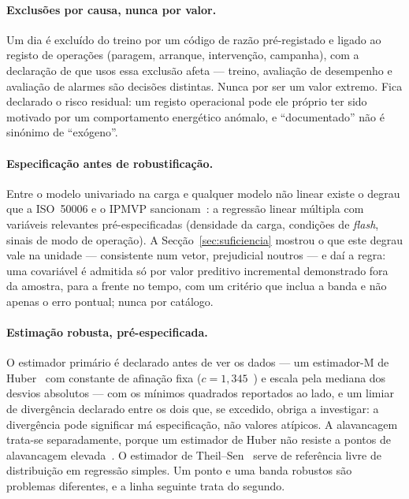 \paragraph{Exclusões por causa, nunca por valor.} Um dia é excluído do treino
por um código de razão pré-registado e ligado ao registo de operações
(paragem, arranque, intervenção, campanha), com a declaração de que usos
essa exclusão afeta --- treino, avaliação de desempenho e avaliação de
alarmes são decisões distintas. Nunca por ser um valor extremo. Fica
declarado o risco residual: um registo operacional pode ele próprio ter sido
motivado por um comportamento energético anómalo, e ``documentado'' não é
sinónimo de ``exógeno''.

\paragraph{Especificação antes de robustificação.} Entre o modelo univariado
na carga e qualquer modelo não linear existe o degrau que a ISO~50006 e o
IPMVP sancionam~\cite{ISO50006_2014,IPMVP_2022}: a regressão linear múltipla com variáveis relevantes
pré-especificadas (densidade da carga, condições de \emph{flash}, sinais de
modo de operação). A Secção~\ref{sec:suficiencia} mostrou o que este degrau
vale na unidade --- consistente num vetor, prejudicial noutros --- e daí a
regra: uma covariável é admitida só por valor preditivo incremental
demonstrado fora da amostra, para a frente no tempo, com um critério que
inclua a banda e não apenas o erro pontual; nunca por catálogo.

\paragraph{Estimação robusta, pré-especificada.} O estimador primário é
declarado antes de ver os dados --- um estimador-M de Huber~\cite{Huber1964,HuberRonchetti2009} com constante
de afinação fixa ($c = 1{,}345$~\cite{HollandWelsch1977}) e escala pela
mediana dos desvios absolutos ---
com os mínimos quadrados reportados ao lado, e um limiar de divergência
declarado entre os dois que, se excedido, obriga a investigar: a divergência
pode significar má especificação, não valores atípicos. A alavancagem
trata-se separadamente, porque um estimador de Huber não resiste a pontos de
alavancagem elevada~\cite{RousseeuwLeroy1987}. O estimador de Theil--Sen~\cite{Sen1968} serve de referência livre de
distribuição em regressão simples. Um ponto e uma banda robustos são
problemas diferentes, e a linha seguinte trata do segundo.

